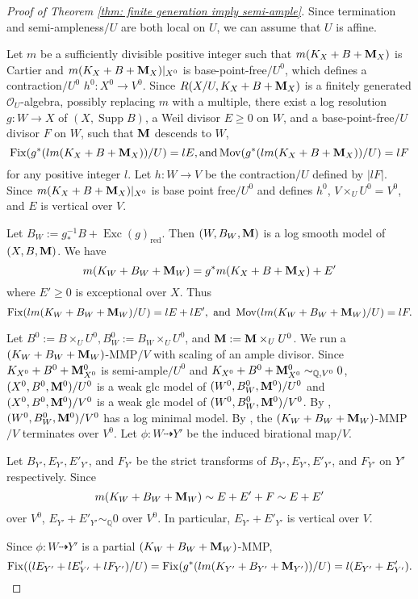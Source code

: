 \documentclass[11pt]{amsart}
\numberwithin{equation}{section}
\newcommand{\Mm}{{\bf{M}}}
\newcommand{\Qq}{\mathbb{Q}}
\newcommand{\Exc}{\operatorname{Exc}}
\newcommand{\Fix}{\operatorname{Fix}}
\newcommand{\Mov}{\operatorname{Mov}}
\newcommand{\Supp}{\operatorname{Supp}}
\newcommand{\Oo}{\mathcal{O}}
\theoremstyle{definition}
\theoremstyle{definition}
\theoremstyle{definition}
\begin{document}
\begin{proof}[Proof of Theorem \ref{thm: finite generation imply semi-ample}]
  Since termination and semi-ampleness$/U$ are both local on $U$, we
  can assume that $U$ is affine.

  Let $m$ be a sufficiently divisible positive integer such that
  $m(K_X+B+\Mm_X)$ is Cartier and $m(K_X+B+\Mm_X)|_{X^0}$ is
  base-point-free$/U^0$, which defines a contraction$/U^0$ $h^0:
  X^0\to V^0$. Since $R(X/U,K_X+B+\Mm_X)$ is a finitely
  generated $\Oo_U$-algebra, possibly replacing $m$ with a multiple, there
  exist a log resolution $g: W\to X$ of $(X,\Supp B)$, a Weil divisor
  $E\ge 0$ on $W$, and a base-point-free$/U$ divisor $F$ on $W$, such
  that $\Mm$ descends to $W$,
  $$
  \Fix(g^*(lm(K_X+B+\Mm_X))/U)=lE, \text{and}  \Mov(g^*(lm(K_X+B+\Mm_X))/U)=lF
  $$
  for any positive integer $l$. Let $h: W\rightarrow V$ be the
  contraction$/U$ defined by $|lF|$. Since $m(K_X+B+\Mm_X)|_{X^0}$ is
  base point free$/U^0$ and defines $h^0$, $V\times_UU^0=V^0$, and
  $E$ is vertical over $V$.

  Let $B_W:=g^{-1}_*B+\Exc(g)_{\text{red}}$. Then $(W,B_W,\Mm)$ is a
  log smooth model of $(X,B,\Mm)$. We have
  $$
  m(K_W+B_W+\Mm_W)=g^*m(K_X+B+\Mm_X)+E'
  $$
  where $E'\ge0$ is exceptional over $X$. Thus
  $$
  \Fix(lm(K_W+B_W+\Mm_W)/U)=lE+lE', \text{ and }\Mov(lm(K_W+B_W+\Mm_W)/U)=lF.
  $$

  Let $B^0:=B\times_UU^0, B_W^0:=B_W\times_UU^0$, and
  $\Mm:=\Mm\times_UU^0$. We run a $(K_W+B_W+\Mm_W)$-MMP$/V$ with
  scaling of an ample divisor. Since $K_{X^0}+B^0+\Mm^0_{X^0}$ is
  semi-ample$/U^0$ and $K_{X^0}+B^0+\Mm^0_{X^0}\sim_{\mathbb
  Q,V^0}0$, $(X^0,B^0,\Mm^0)/U^0$ is a weak glc model of
  $(W^0,B^0_W,\Mm^0)/U^0$ and $(X^0,B^0,\Mm^0)/V^0$ is a weak glc
  model of $(W^0,B^0_W,\Mm^0)/V^0$. By \cite[Lemma 3.15]{HL21a},
  $(W^0,B^0_W,\Mm^0)/V^0$ has a log minimal
  model. By \cite[Theorem 2.24]{HL21a}, the $(K_W+B_W+\Mm_W)$-MMP$/V$
  terminates over $V^0$. Let $\phi: W\dashrightarrow Y'$ be the
  induced birational map$/V$.

  Let $B_{Y'},E_{Y'},E'_{Y'}$, and $F_{Y'}$ be the strict transforms
  of $B_{Y'},E_{Y'},E'_{Y'}$, and $F_{Y'}$ on $Y'$ respectively. Since
  $$ m(K_W+B_W+\Mm_W)\sim E+E'+F\sim E+E'$$
  over $V^0$, $E_{Y'}+E'_{Y'}\sim_\Qq 0$ over $V^0$. In particular,
  $E_{Y'}+E'_{Y'}$ is vertical over $V$.

  Since $\phi: W\dashrightarrow Y'$ is a partial $(K_W+B_W+\Mm_W)$-MMP,
  $$\Fix((lE_{Y'}+lE'_{Y'}+lF_{Y'})/U)=\Fix(g^*(lm(K_{Y'}+B_{Y'}+\Mm_{Y'}))/U)=l(E_{Y'}+E_{Y'}').$$


\end{proof}
\end{document}

